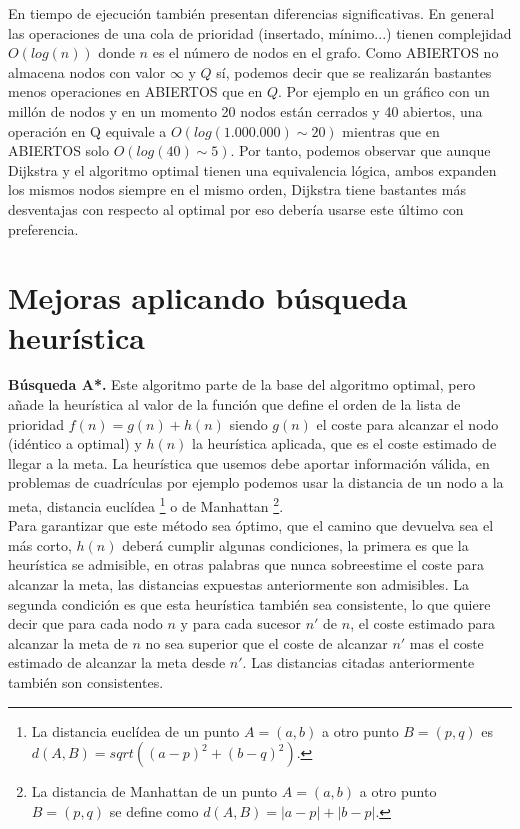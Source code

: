 \documentclass{article}
\begin{document}
En tiempo de ejecución también presentan diferencias significativas. En general las operaciones de una cola de prioridad (insertado, mínimo...) tienen complejidad $O(log(n))$ donde $n$ es el número de nodos en el grafo. Como ABIERTOS no almacena nodos con valor $\infty$ y $Q$ sí, podemos decir que se realizarán bastantes menos operaciones en ABIERTOS que en $Q$. Por ejemplo en un gráfico con un millón de nodos y en un momento 20 nodos están cerrados y 40 abiertos, una operación en Q equivale a $O(log(1.000.000) \sim  20)$ mientras que en ABIERTOS solo $O(log(40) \sim 5)$. Por tanto, podemos observar que aunque Dijkstra y el algoritmo optimal tienen una equivalencia lógica, ambos expanden los mismos nodos siempre en el mismo orden, Dijkstra tiene bastantes más desventajas con respecto al optimal por eso debería usarse este último con preferencia.


\section{Mejoras aplicando búsqueda heurística}
\textbf{Búsqueda A*.} Este algoritmo parte de la base del algoritmo optimal, pero añade la heurística al valor de la función que define el orden de la lista de prioridad $f(n)=g(n)+h(n)$ siendo $g(n)$ el coste para alcanzar el nodo (idéntico a optimal) y $h(n)$ la heurística aplicada, que es el coste estimado de llegar a la meta. La heurística que usemos debe aportar información válida, en problemas de cuadrículas por ejemplo podemos usar la distancia de un nodo a la meta, distancia euclídea \footnote{La distancia euclídea de un punto $A=(a,b)$ a otro punto $B=(p,q)$ es $d(A,B)=sqrt{((a-p)^2+(b-q)^2)}$.} o de Manhattan \footnote{La distancia de Manhattan de un punto $A=(a,b)$ a otro punto $B=(p,q)$ se define como $d(A,B)=|a-p|+|b-p|$.}. 
\\

Para garantizar que este método sea óptimo, que el camino que devuelva sea el más corto, $h(n)$ deberá cumplir algunas condiciones, la primera es que la heurística se admisible, en otras palabras que nunca sobreestime el coste para alcanzar la meta, las distancias expuestas anteriormente son admisibles. La segunda condición es que esta heurística también sea consistente, lo que quiere decir que para cada nodo $n$ y para cada sucesor $n'$ de $n$, el coste estimado para alcanzar la meta de $n$ no sea superior que el coste de alcanzar $n'$ mas el coste estimado de alcanzar la meta desde $n'$. Las distancias citadas anteriormente también son consistentes.
\\
\end{document}

